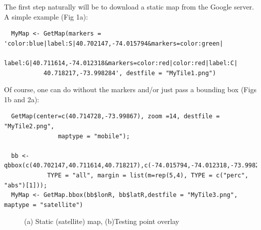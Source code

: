\documentclass{article}
\begin{document}
\noindent The first step naturally will be to download a static map from the Google server. A simple example (Fig 1a):
\begin{verbatim}
  MyMap <- GetMap(markers = 'color:blue|label:S|40.702147,-74.015794&markers=color:green|
           label:G|40.711614,-74.012318&markers=color:red|color:red|label:C|
           40.718217,-73.998284', destfile = "MyTile1.png")

\end{verbatim}
Of course, one can do without the markers and/or just pass a bounding box (Figs 1b and 2a):
\begin{verbatim}
  GetMap(center=c(40.714728,-73.99867), zoom =14, destfile = "MyTile2.png",
               maptype = "mobile");
  
  bb <- qbbox(c(40.702147,40.711614,40.718217),c(-74.015794,-74.012318,-73.998284), 
            TYPE = "all", margin = list(m=rep(5,4), TYPE = c("perc", "abs")[1]));
  MyMap <- GetMap.bbox(bb$lonR, bb$latR,destfile = "MyTile3.png", maptype = "satellite")
\end{verbatim}
\begin{figure}[ht]
    \caption{(a) Static (satellite) map, (b)Testing point overlay}
\end{figure}
\end{document}

